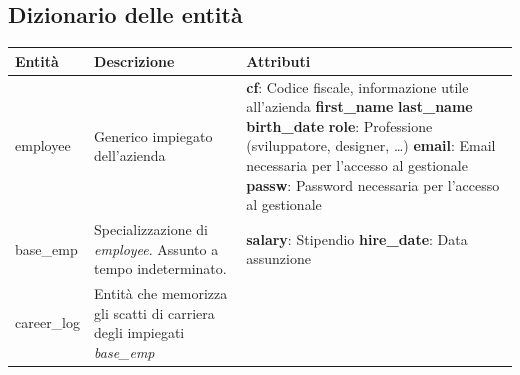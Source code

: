 \subsection{Dizionario delle entità}
\begin{longtable}{@{}| p{} | p{} | p{} |}
	\hline
	Entità               & Descrizione                                                                                            & Attributi \\
	\hline
	employee             & \begin{minipage}[t]{0.4\textwidth}
		                       \raggedright
		                       Generico impiegato dell'azienda
	                       \end{minipage}
	                     & \begin{minipage}[t]{0.3\textwidth}
		                       \raggedright
		                       \textbf{cf}: Codice fiscale, informazione utile all'azienda\sskip
		                       \textbf{first\_name} \sskip
		                       \textbf{last\_name} \sskip
		                       \textbf{birth\_date} \sskip
		                       \textbf{role}: Professione (sviluppatore, designer, \dots)\sskip
		                       \textbf{email}: Email necessaria per l'accesso al gestionale\sskip
		                       \textbf{passw}: Password necessaria per l'accesso al gestionale
	                       \end{minipage}                                                  \\[140pt]
	\hline
	base\_emp            & \begin{minipage}[t]{0.4\textwidth}
		                       \raggedright
		                       Specializzazione di \textit{employee}. Assunto a tempo indeterminato.
	                       \end{minipage}
	                     & \begin{minipage}[t]{0.3\textwidth}
		                       \raggedright
		                       \textbf{salary}: Stipendio\sskip
		                       \textbf{hire\_date}: Data assunzione
	                       \end{minipage}                                                                                \\[20pt]
	\hline
	career\_log          & \begin{minipage}[t]{0.4\textwidth}
		                       \raggedright
		                       Entità che memorizza gli scatti di carriera degli impiegati \textit{base\_emp}

\end{minipage}
\end{longtable}
